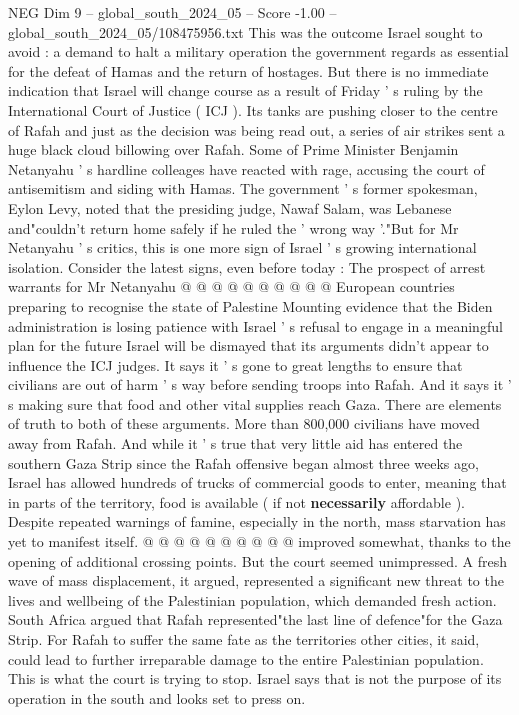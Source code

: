 \begin{textsample}{NEG Dim 9 – global\_south\_2024\_05 – Score -1.00 – global\_south\_2024\_05/108475956.txt}  \label{ex:f9_neg_333}
This was the outcome Israel sought to avoid : a demand to halt a military operation the government regards as essential for the defeat of Hamas and the return of hostages.
But there is no immediate indication that Israel will change course as a result of Friday ' s ruling by the International Court of Justice ( ICJ ).
Its tanks are pushing closer to the centre of Rafah and just as the decision was being read out, a series of air strikes sent a huge black cloud billowing over Rafah.
Some of Prime Minister Benjamin Netanyahu ' s hardline colleages have reacted with rage, accusing the court of antisemitism and siding with Hamas.
The government ' s former spokesman, Eylon Levy, noted that the presiding judge, Nawaf Salam, was Lebanese and"couldn't return home safely if he ruled the ' wrong way '."But for Mr Netanyahu ' s critics, this is one more sign of Israel ' s growing international isolation.
Consider the latest signs, even before today : The prospect of arrest warrants for Mr Netanyahu @ @ @ @ @ @ @ @ @ @ European countries preparing to recognise the state of Palestine Mounting evidence that the Biden administration is losing patience with Israel ' s refusal to engage in a meaningful plan for the future Israel will be dismayed that its arguments didn't appear to influence the ICJ judges.
It says it ' s gone to great lengths to ensure that civilians are out of harm ' s way before sending troops into Rafah.
And it says it ' s making sure that food and other vital supplies reach Gaza.
There are elements of truth to both of these arguments.
More than 800,000 civilians have moved away from Rafah.
And while it ' s true that very little aid has entered the southern Gaza Strip since the Rafah offensive began almost three weeks ago, Israel has allowed hundreds of trucks of commercial goods to enter, meaning that in parts of the territory, food is available ( if not \textbf{necessarily} affordable ).
Despite repeated warnings of famine, especially in the north, mass starvation has yet to manifest itself. @ @ @ @ @ @ @ @ @ @ improved somewhat, thanks to the opening of additional crossing points.
But the court seemed unimpressed.
A fresh wave of mass displacement, it argued, represented a significant new threat to the lives and wellbeing of the Palestinian population, which demanded fresh action.
South Africa argued that Rafah represented"the last line of defence"for the Gaza Strip.
For Rafah to suffer the same fate as the territories other cities, it said, could lead to further irreparable damage to the entire Palestinian population.
This is what the court is trying to stop.
Israel says that is not the purpose of its operation in the south and looks set to press on.

\end{textsample}
